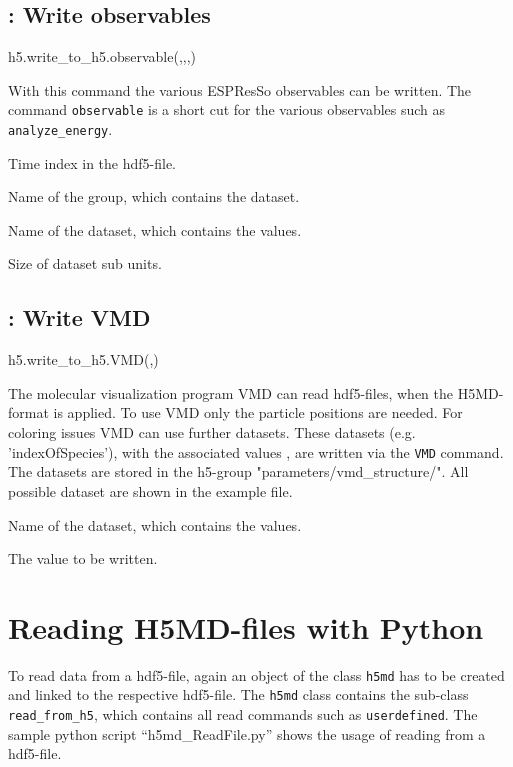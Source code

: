 \subsection{: Write observables}
\begin{pyessyntax}
h5.write_to_h5.observable(,,,)
\end{pyessyntax}
With this command the various ESPResSo observables can be written. The command \texttt{observable} is a short cut for the various observables such as \texttt{analyze_energy}.
\begin{arguments}
\item[\var{timestep}] Time index in the hdf5-file.
\item[\var{groupname}] Name of the group, which contains the dataset.
\item[\var{datasetname}] Name of the dataset, which contains the values.
\item[\var{chunks}] Size of dataset sub units.
\end{arguments}

\subsection{: Write VMD}
\begin{pyessyntax}
h5.write_to_h5.VMD(,)
\end{pyessyntax}
The molecular visualization program VMD can read hdf5-files, when the H5MD-format is applied. To use VMD only the particle positions are needed. For coloring issues VMD can use further datasets. These datasets  (e.g. 'indexOfSpecies'), with the associated values , are written via the \texttt{VMD} command. The datasets are stored in the h5-group "parameters/vmd_structure/". All possible dataset are shown in the example file. 
\begin{arguments}
\item[\var{datasetname}] Name of the dataset, which contains the values.
\item[\var{value}] The value to be written.
\end{arguments}


\section{Reading H5MD-files with Python}
To read data from a hdf5-file, again an object of the class \texttt{h5md} has to be created and linked to the respective hdf5-file. The \texttt{h5md} class contains the sub-class \texttt{read_from_h5}, which contains all read commands such as \texttt{userdefined}. The sample python script ``h5md_ReadFile.py'' shows the usage of reading from a hdf5-file.
